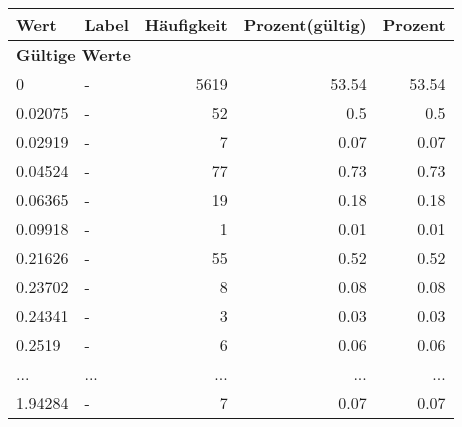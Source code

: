      \begin{longtable}{lXrrr}
     \toprule
     \textbf{Wert} & \textbf{Label} & \textbf{Häufigkeit} & \textbf{Prozent(gültig)} & \textbf{Prozent} \\
     \endhead
     \midrule
     \multicolumn{5}{l}{\textbf{Gültige Werte}}\\
        0 & \multicolumn{1}{X}{-} & %
          \num{5619} &
          \num[round-mode=places,round-precision=2]{53,54} &
          \num[round-mode=places,round-precision=2]{53,54} \\
        0.02075 & \multicolumn{1}{X}{-} & %
          \num{52} &
          \num[round-mode=places,round-precision=2]{0,5} &
          \num[round-mode=places,round-precision=2]{0,5} \\
        0.02919 & \multicolumn{1}{X}{-} & %
          \num{7} &
          \num[round-mode=places,round-precision=2]{0,07} &
          \num[round-mode=places,round-precision=2]{0,07} \\
        0.04524 & \multicolumn{1}{X}{-} & %
          \num{77} &
          \num[round-mode=places,round-precision=2]{0,73} &
          \num[round-mode=places,round-precision=2]{0,73} \\
        0.06365 & \multicolumn{1}{X}{-} & %
          \num{19} &
          \num[round-mode=places,round-precision=2]{0,18} &
          \num[round-mode=places,round-precision=2]{0,18} \\
        0.09918 & \multicolumn{1}{X}{-} & %
          \num{1} &
          \num[round-mode=places,round-precision=2]{0,01} &
          \num[round-mode=places,round-precision=2]{0,01} \\
        0.21626 & \multicolumn{1}{X}{-} & %
          \num{55} &
          \num[round-mode=places,round-precision=2]{0,52} &
          \num[round-mode=places,round-precision=2]{0,52} \\
        0.23702 & \multicolumn{1}{X}{-} & %
          \num{8} &
          \num[round-mode=places,round-precision=2]{0,08} &
          \num[round-mode=places,round-precision=2]{0,08} \\
        0.24341 & \multicolumn{1}{X}{-} & %
          \num{3} &
          \num[round-mode=places,round-precision=2]{0,03} &
          \num[round-mode=places,round-precision=2]{0,03} \\
        0.2519 & \multicolumn{1}{X}{-} & %
          \num{6} &
          \num[round-mode=places,round-precision=2]{0,06} &
          \num[round-mode=places,round-precision=2]{0,06} \\
       ... & ... & ... & ... & ... \\
        1.94284 & \multicolumn{1}{X}{-} & %
          \num{7} &
          \num[round-mode=places,round-precision=2]{0,07} &
          \num[round-mode=places,round-precision=2]{0,07} \\


\end{longtable}
